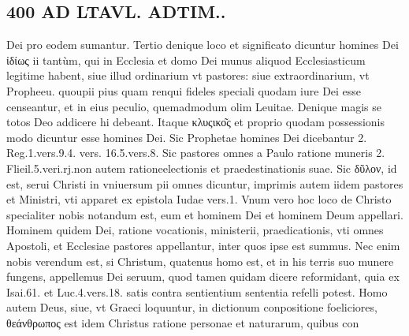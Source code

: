 \documentclass{article}
\begin{document}
\begin{pages}
\section*{400 AD LTAVL. ADTIM.. }\pstart Dei pro eodem sumantur. Tertio denique loco et significato dicuntur homines Dei ἰδίως ii tantùm, qui in Ecclesia et domo Dei munus aliquod Ecclesiasticum legitime habent, siue illud ordinarium vt pastores: siue extraordinarium, vt Propheeu. quoupii pius quam renqui fideles speciali quodam iure Dei esse censeantur, et in eius peculio, quemadmodum olim Leuitae.  \pend\pstart Denique  magis se totos Deo addicere hi debeant. Itaque κλυςικο͂ς et proprio quodam possessionis modo dicuntur esse homines Dei. Sic Prophetae homines Dei dicebantur 2. Reg.1.vers.9.4. vers. 16.5.vers.8. Sic pastores omnes a Paulo ratione muneris 2. Flieil.5.veri.rj.non autem rationeelectionis et praedestinationis suae. Sic δῦλον, id est, serui Christi in vniuersum pii omnes dicuntur, imprimis autem iidem pastores et Ministri, vti apparet ex epistola Iudae vers.1.  \pend\pstart Vnum vero hoc loco de Christo specialiter nobis notandum est, eum et hominem Dei et hominem Deum appellari. Hominem quidem Dei, ratione vocationis, ministerii, praedicationis, vti omnes Apostoli, et Ecclesiae pastores appellantur, inter quos ipse est summus. Nec enim nobis verendum est, si Christum, quatenus homo est, et in his terris suo munere fungens, appellemus Dei seruum, quod tamen quidam dicere reformidant, quia ex Isai.61. et Luc.4.vers.18. satis contra sentientium sententia refelli potest. Homo autem Deus, siue, vt Graeci loquuntur, in dictionum conpositione foeliciores, θεάνθρωπος est idem Christus ratione personae et naturarum, quibus con\pend

\end{pages}
\end{document}
